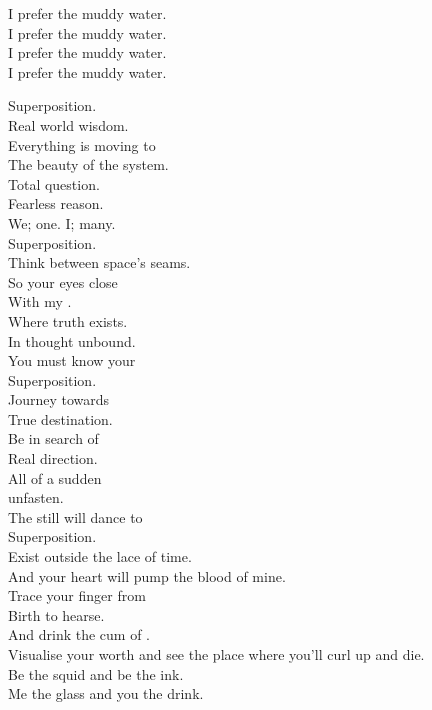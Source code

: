 I prefer the muddy water. \\
I prefer the muddy water. \\
I prefer the muddy water. \\
I prefer the muddy water. \\




Superposition. \\
Real world wisdom. \\
Everything is moving to \\
The beauty of the system. \\

Total question. \\
Fearless reason. \\
We; one. I; many. \\
Superposition. \\

Think between space's seams. \\
So your eyes close \\
With my . \\
Where truth exists. \\
In thought unbound. \\
You must know your \\
Superposition. \\

Journey towards \\
True destination. \\
Be in search of \\
Real direction. \\

All of a sudden \\
 unfasten. \\
The still will dance to \\
Superposition. \\

Exist outside the lace of time. \\
And your heart will pump the blood of mine. \\
Trace your finger from \\
Birth to hearse. \\
And drink the cum of . \\
Visualise your worth and see the place where you'll curl up and die. \\
Be the squid and be the ink. \\
Me the glass and you the drink. \\


